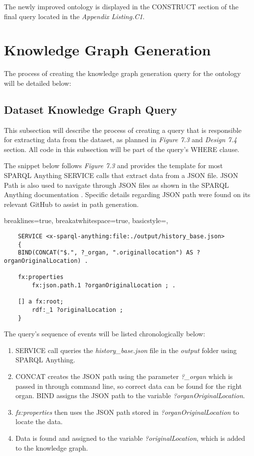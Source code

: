 The newly improved ontology is displayed in the CONSTRUCT section of the final query located in the \textit{Appendix Listing.C1}.

\section{Knowledge Graph Generation}
\hspace*{0.5cm} The process of creating the knowledge graph generation query for the ontology will be detailed below:

\subsection{Dataset Knowledge Graph Query}
\hspace*{0.5cm} This subsection will describe the process of creating a query that is responsible for extracting data from the dataset, as planned in \textit{Figure 7.3} and \textit{Design 7.4} section. All code in this subsection will be part of the query's WHERE clause. 

The snippet below follows \textit{Figure 7.3} and provides the template for most SPARQL Anything SERVICE calls that extract data from a JSON file. JSON Path is also used to navigate through JSON files as shown in the SPARQL Anything documentation \cite{sparqlanythinggithub}. Specific details regarding JSON path were found on its relevant GitHub \cite{jsonpath} to assist in path generation. 

\lstset
{
    breaklines=true,
    breakatwhitespace=true,
    basicstyle=\linespread{1.5}\ttfamily,
}
\begin{lstlisting}
    SERVICE <x-sparql-anything:file:./output/history_base.json> 
    {
    BIND(CONCAT("$.", ?_organ, ".originallocation") AS ?organOriginalLocation) .

    fx:properties
        fx:json.path.1 ?organOriginalLocation ; .

    [] a fx:root; 
        rdf:_1 ?originalLocation ;
    } 
\end{lstlisting}

The query's sequence of events will be listed chronologically below:

\begin{enumerate}
    \item SERVICE call queries the \textit{history\_base.json} file in the \textit{output} folder using SPARQL Anything. 
    \item CONCAT creates the JSON path using the parameter \textit{?\_organ} which is passed in through command line, so correct data can be found for the right organ. BIND assigns the JSON path to the variable \textit{?organOriginalLocation}.
    \item \textit{fx:properties} then uses the JSON path stored in \textit{?organOriginalLocation} to locate the data.
    \item Data is found and assigned to the variable \textit{?originalLocation}, which is added to the knowledge graph.
\end{enumerate}

